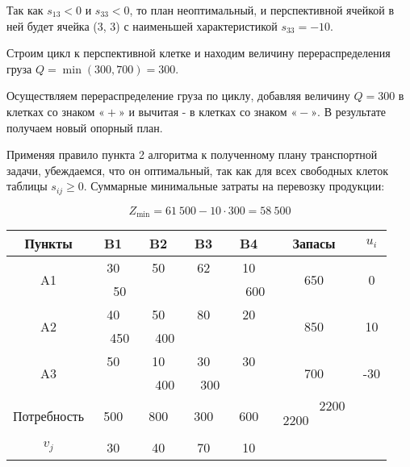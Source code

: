 \documentclass[a4paper,12pt]{article}
\begin{document}
Так как $s_{13} < 0$ и $s_{33} < 0$, то план неоптимальный, и перспективной ячейкой в ней будет ячейка (3, 3) с наименьшей характеристикой $s_{33} = - 10$. 

Строим цикл к перспективной клетке и находим величину перераспределения груза $Q = \min(300, 700) = 300$.

Осуществляем перераспределение груза по циклу, добавляя величину $Q = 300$ в клетках со знаком $«+»$ и вычитая - в клетках со знаком $«-»$. В результате получаем новый опорный план.

Применяя правило пункта 2 алгоритма к полученному плану транспортной задачи, убеждаемся, что он оптимальный, так как для всех свободных клеток таблицы $s_{ij} \geqslant 0$. Суммарные минимальные затраты на перевозку продукции:

\[
	Z_{\min} = 61 \ 500 - 10 \cdot 300 = 58 \ 500
\]

\begin{center}
	\begin{tabular}{|c|c|c|c|c|c|c|c|c|cc}
		\hline
		Пункты & \multicolumn{2}{c|}{B1} & \multicolumn{2}{c|}{B2} & \multicolumn{2}{c|}{B3} & \multicolumn{2}{c|}{B4} & \multicolumn{1}{c|}{Запасы} & \multicolumn{1}{c|}{$u_i$} \\ \hline
		\multirow{2}{*}{A1} & \multicolumn{2}{c|}{30} & \multicolumn{2}{c|}{50} & \multicolumn{2}{c|}{62} & \multicolumn{2}{c|}{10} & \multicolumn{1}{c|}{\multirow{2}{*}{650}} & \multicolumn{1}{c|}{\multirow{2}{*}{0}} \\ \cline{2-9}
		&  & 50 &  &  &  &  &  & 600 & \multicolumn{1}{c|}{} & \multicolumn{1}{c|}{} \\ \hline
		\multirow{2}{*}{A2} & \multicolumn{2}{c|}{40} & \multicolumn{2}{c|}{50} & \multicolumn{2}{c|}{80} & \multicolumn{2}{c|}{20} & \multicolumn{1}{c|}{\multirow{2}{*}{850}} & \multicolumn{1}{c|}{\multirow{2}{*}{10}} \\ \cline{2-9}
		&  & 450 &  & 400 &  &  &  &  & \multicolumn{1}{c|}{} & \multicolumn{1}{c|}{} \\ \hline
		\multirow{2}{*}{A3} & \multicolumn{2}{c|}{50} & \multicolumn{2}{c|}{10} & \multicolumn{2}{c|}{30} & \multicolumn{2}{c|}{30} & \multicolumn{1}{c|}{\multirow{2}{*}{700}} & \multicolumn{1}{c|}{\multirow{2}{*}{-30}} \\ \cline{2-9}
		&  &  &  & 400 &  & 300 &  &  & \multicolumn{1}{c|}{} & \multicolumn{1}{c|}{} \\ \hline
		Потребность & \multicolumn{2}{c|}{500} & \multicolumn{2}{c|}{800} & \multicolumn{2}{c|}{300} & \multicolumn{2}{c|}{600} & \multicolumn{1}{c|}{$\begin{matrix}
				& 2200 \\
				2200 & \\
			\end{matrix}$} &  \\ \cline{1-10}
		$v_j$ & \multicolumn{2}{c|}{30} & \multicolumn{2}{c|}{40} & \multicolumn{2}{c|}{70} & \multicolumn{2}{c|}{10} &  &  \\ \cline{1-9}
	\end{tabular}
\end{center}
\end{document}
